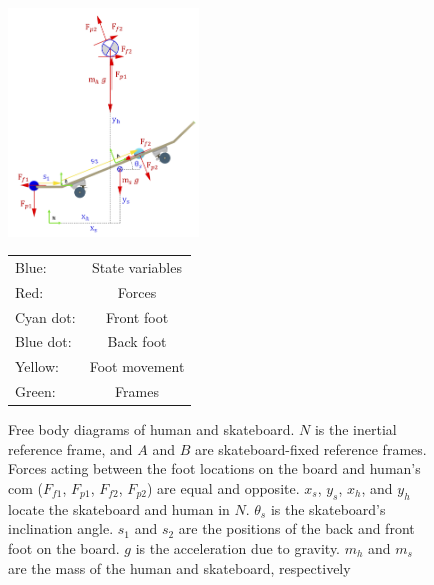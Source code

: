 \documentclass[default,iicol]{sn-jnl}
\begin{document}
\begin{figure}
    \centering
    \includegraphics[width=0.45\textwidth]{figure/Fig3.png}
    \footnotesize
  \begin{center}
  \begin{tabular}{l c}
    \toprule
    \color{blue}Blue: & State variables \\
    \color{red} Red: & Forces \\ 
    \color{cyan}Cyan dot: & Front foot \\
    \color{blue}Blue dot: & Back foot \\ 
    \color{yellow}Yellow: & Foot movement \\
    \color{green}Green: & Frames \\
    \bottomrule
    \end{tabular}
    \end{center}
    
    \caption[Free Body Diagram of Phase 1]{Free body diagrams of human and skateboard. $N$ is the inertial reference frame, and $A$ and $B$ are skateboard-fixed reference frames. Forces acting between the foot locations on the board and human's \gls{com} ($F_{f1}$, $F_{p1}$, $F_{f2}$, $F_{p2}$) are equal and opposite. $x_s$, $y_s$, $x_h$, and $y_h$ locate the skateboard and human in $N$. $\theta_s$ is the skateboard's inclination angle. $s_1$ and $s_2$ are the positions of the back and front foot on the board. $g$ is the acceleration due to gravity. $m_h$ and $m_s$ are the mass of the human and skateboard, respectively}
    \label{fig:FBD}
\end{figure}
\end{document}
